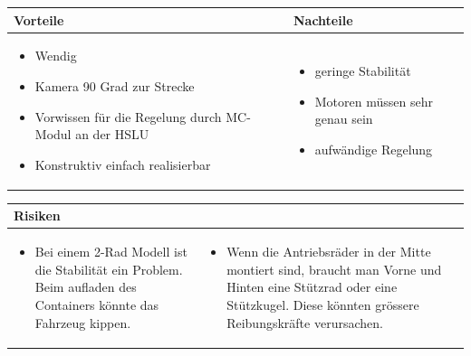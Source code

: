 \begin{table}[h]
\begin{tabular}{p{} | p{}}


 \textbf{Vorteile} & \textbf{Nachteile} \\ \hline
	 
\begin{itemize}
\item Wendig
\item Kamera 90 Grad zur Strecke
\item Vorwissen für die Regelung durch MC-Modul an der HSLU
\item Konstruktiv einfach realisierbar
\end{itemize}

 
 &
 
\begin{itemize}
\item geringe Stabilität
\item Motoren müssen sehr genau sein
\item aufwändige Regelung
\end{itemize}

\end{tabular}
\end{table}

\begin{table}[h]
\begin{tabular}{p{}p{}}


 \textbf{Risiken} & \\ \hline
	 
\begin{itemize}
\item Bei einem 2-Rad Modell ist die Stabilität ein Problem. Beim aufladen des Containers könnte das Fahrzeug kippen.
\end{itemize}
&
\begin{itemize}
\item Wenn die Antriebsräder in der Mitte montiert sind, braucht man Vorne und Hinten eine Stützrad oder eine Stützkugel. Diese könnten grössere Reibungskräfte verursachen.
\end{itemize}


 
\end{tabular}
\end{table}

\pagebreak